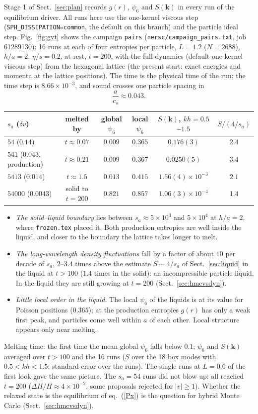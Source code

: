 \documentclass[11pt,aps,preprint,nofootinbib,superscriptaddress,tightenlines]{revtex4-2}
\def\st{\begin{equation}}
\def\stp{\end{equation}}
\def\Eq#1{eq.~(\ref{#1})}
\def\Sect#1{Sect.~\ref{#1}}
\def\Fig#1{Fig.~\ref{#1}}
\begin{document}
Stage 1 of \Sect{sec:plan} records $g(r)$, $\psi_6$ and $S(\bm k)$ in every run of the equilibrium driver.  All runs here use the
one-kernel viscous step (\texttt{SPH\_DISSIPATION=common}, the default on this branch) and the particle ideal step.
\Fig{fig:gvt} shows the campaign \texttt{pairs} (\texttt{nersc/campaign\_pairs.txt}, job 61289130): 16 runs at each of four
entropies per particle, $L=1.2$ ($N=2688$), $h/a=2$, $\eta/s=0.2$, at rest, $t=200$, with the full dynamics (default one-kernel
viscous step) from the hexagonal lattice (the present start: exact energies and momenta at the lattice positions).  The
time is the physical time of the run; the time step is $8.66\times10^{-3}$, and sound crosses one particle spacing in
\st
\frac a{c_s}\approx0.043 .
\stp
\begin{center}
\begin{tabular}{lccccc}
\hline
$s_a$ ($\delta v$) & melted by & global $\psi_6$ & local $\psi_6$ & $S(\bm k)$, $kh=0.5$--$1.5$ & $S/(4/s_a)$ \\ \hline
$54$ ($0.14$) & $t\approx0.07$ & $0.009$ & $0.365$ & $0.176(3)$ & $2.4$ \\
$541$ ($0.043$, production) & $t\approx0.21$ & $0.009$ & $0.367$ & $0.0250(5)$ & $3.4$ \\
$5413$ ($0.014$) & $t\approx1.5$ & $0.013$ & $0.415$ & $1.56(4)\times10^{-3}$ & $2.1$ \\
$54000$ ($0.0043$) & solid to $t=200$ & $0.821$ & $0.857$ & $1.06(3)\times10^{-4}$ & $1.4$ \\
\hline
\end{tabular}
\end{center}
\begin{itemize}
\item \emph{The solid--liquid boundary} lies between $s_a\approx5\times10^3$ and $5\times10^4$ at $h/a=2$, where \texttt{frozen.tex} placed it.
  Both production entropies are well inside the liquid, and closer to the boundary the lattice takes longer to melt.
\item \emph{The long-wavelength density fluctuations} fall by a factor of about $10$ per decade of $s_a$, $2$--$3.4$ times above
  the estimate $S\sim4/s_a$ of \Sect{sec:liquid} in the liquid at $t>100$ ($1.4$ times in the solid): an incompressible particle
  liquid.  In the liquid they are still growing at $t=200$ (\Sect{sec:hmcvsdyn}).
\item \emph{Little local order in the liquid.}  The local $\psi_6$ of the liquids is at its value for Poisson positions
  ($0.365$); at the production entropies $g(r)$ has only a weak first peak, and particles come well within $a$ of each other.
  Local structure appears only near melting.
\end{itemize}
Melting time: the first time the mean global $\psi_6$ falls below $0.1$; $\psi_6$ and $S(\bm k)$ averaged over $t>100$ and the 16 runs ($S$ over the 18
box modes with $0.5<kh<1.5$; standard error over the runs).  The single runs at $L=0.6$ of the first look gave the same
picture.  The $s_a=54$ runs did not blow up: all reached $t=200$ ($\Delta H/H\approx4\times10^{-2}$, some proposals rejected for $|v|\ge1$).
Whether the relaxed state is the equilibrium of \Eq{Px} is the question for hybrid Monte Carlo (\Sect{sec:hmcvsdyn}).
\end{document}
